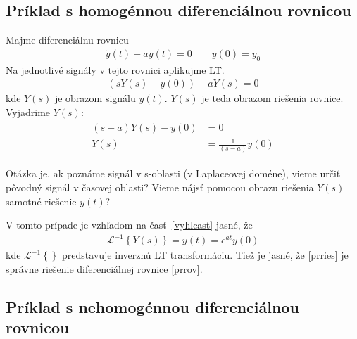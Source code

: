 \documentclass[a4paper, 10pt, ]{article}
\begin{document}
\subsection{Príklad s homogénnou diferenciálnou rovnicou}

Majme diferenciálnu rovnicu
\begin{align}  \label{prrov}
    \dot y(t) - a y(t) = 0 \qquad y(0) = y_0
\end{align}
Na jednotlivé signály v tejto rovnici aplikujme LT.
\begin{align}
    \left( s Y(s) - y(0)  \right) - a Y(s) = 0
\end{align}
kde $Y(s)$ je obrazom signálu $y(t)$. $Y(s)$ je teda obrazom riešenia rovnice. Vyjadrime $Y(s)$:
\begin{align}
    \begin{aligned}
        (s-a)Y(s) - y(0) &= 0 \\
        Y(s) &= \frac{1}{(s-a)} y(0)
    \end{aligned}
\end{align}

Otázka je, ak poznáme signál v s-oblasti (v Laplaceovej doméne), vieme určiť pôvodný signál v časovej oblasti? Vieme nájsť pomocou obrazu riešenia $Y(s)$ samotné riešenie $y(t)$?

V tomto prípade je vzhľadom na časť~\ref{vyhlcast} jasné, že
\begin{align} \label{prries}
    \mathcal L ^{-1} \left\{ Y(s) \right\} = y(t) = e^{at}y(0)
\end{align}
kde $\mathcal L ^{-1} \left\{  \right\}$ predstavuje  inverznú LT transformáciu. Tiež je jasné, že \eqref{prries} je správne riešenie diferenciálnej rovnice \eqref{prrov}.






\subsection{Príklad s nehomogénnou diferenciálnou rovnicou}
\end{document}
